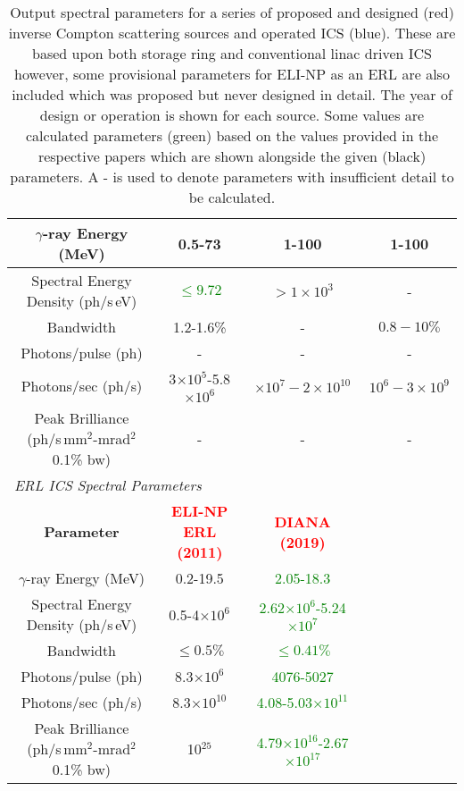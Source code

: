\documentclass[11pt]{article}
\begin{document}
\begin{table}[H]
{\begin{tabular}{|c||c|c|c|}
\hline
\hline
$\gamma$-ray Energy (MeV) & 0.5-73 & 1-100 & 1-100 \\
\hline
Spectral Energy Density (ph/s\,eV) & \textcolor{green}{$\leq 9.72$}  & $> 1\times 10^{3}$ &  - \\
\hline
Bandwidth & 1.2-1.6\% & - & $ 0.8-10\%$ \\
\hline
Photons/pulse (ph) & - & - & - \\
\hline
Photons/sec (ph/s) & 3$\times 10^{5}$-5.8$\times 10^{6}$ & $\times 10^{7}-2\times 10^{10}$ & $10^{6} - 3\times 10^{9}$ \\
\hline
Peak Brilliance (ph/s\,mm$^{2}$-mrad$^{2}$ 0.1\% bw) & - & - & - \\
\hline
\hline
\multicolumn{4}{|l|}{\textit{ERL ICS Spectral Parameters}} \\
\hline
\textbf{Parameter} & \textcolor{red}{\textbf{ELI-NP ERL (2011)}} \cite{ELINPwp} & \textcolor{red}{\textbf{DIANA (2019)}} & \\
\hline
$\gamma$-ray Energy (MeV) & 0.2-19.5 & \textcolor{green}{2.05-18.3} & \\
\hline
Spectral Energy Density (ph/s\,eV) & 0.5-4$\times 10^{6}$ & \textcolor{green}{2.62$\times10^{6}$-5.24$\times 10^{7}$}  & \\
\hline
Bandwidth & $\leq 0.5\%$ & \textcolor{green}{$\leq 0.41\%$} & \\
\hline
Photons/pulse (ph) & 8.3$\times 10^{6}$ & \textcolor{green}{4076-5027} & \\
\hline
Photons/sec (ph/s) & 8.3$\times 10^{10}$ & \textcolor{green}{4.08-5.03$\times 10^{11}$} & \\
\hline
Peak Brilliance (ph/s\,mm$^{2}$-mrad$^{2}$ 0.1\% bw) & 10$^{25}$ & \textcolor{green}{4.79$\times 10^{16}$-2.67$\times 10^{17}$} & \\   
\hline
\end{tabular}}
\caption{\label{tab:gammaICS} Output spectral parameters for a series of proposed and designed (red) inverse Compton scattering sources and operated ICS (blue). These are based upon both storage ring and conventional linac driven ICS however, some provisional parameters for ELI-NP as an ERL are also included which was proposed but never designed in detail. The year of design or operation is shown for each source. Some values are calculated parameters (green) based on the values provided in the respective papers which are shown alongside the given (black) parameters. A - is used to denote parameters with insufficient detail to be calculated.}
\end{table} 
\end{document}
